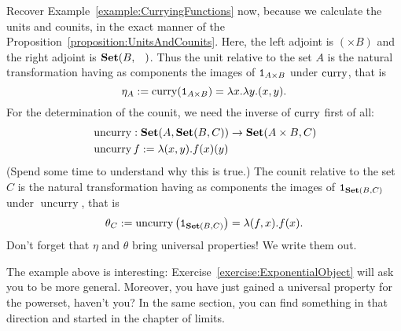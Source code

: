 \newcommand\uncurry{\operatorname{uncurry}}

\begin{example}
  Recover Example~\ref{example:CurryingFunctions} now, because we
  calculate the units and counits, in the exact manner of the
  Proposition~\ref{proposition:UnitsAndCounits}. Here, the left
  adjoint is \((\times B)\) and the right adjoint is
  \(\Set(B, \hole)\). Thus the unit relative to the set \(A\) is the
  natural transformation having as components the images of
  \(\mathtt 1_{A \times B}\) under \(\operatorname{curry}\), that is
  \[\eta_A := \operatorname{curry}(\mathtt 1_{A \times B}) = \lambda x. \lambda y. (x, y) .\]
  For the determination of the counit, we need the inverse of
  \(\operatorname{curry}\) first of all:
  \[
    \begin{aligned}
      & \uncurry : \Set(A, \Set(B, C)) \to \Set(A \times B, C) \\
      & \uncurry f := \lambda (x, y). f(x)(y)
    \end{aligned}
  \]
  (Spend some time to understand why this is true.) The counit
  relative to the set \(C\) is the natural transformation having as
  components the images of \(\mathtt 1_{\mathbf{Set}(B, C)}\) under \(\uncurry\),
  that is
  \[\theta_C := \uncurry\left(\id_{\Set(B, C)}\right) = \lambda (f,
    x). f(x) .\] Don't forget that \(\eta\) and \(\theta\) bring universal
  properties! We write them out. \YetToBeTeXed
\end{example}

\begin{remark}
  The example above is interesting:
  Exercise~\ref{exercise:ExponentialObject} will ask you to be more
  general. Moreover, you have just gained a universal property for the
  powerset, haven't you? In the same section, you can find something
  in that direction and started in the chapter of
  limits. \YetToBeTeXed
\end{remark}

